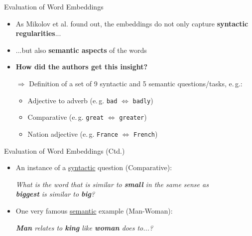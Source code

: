 \begin{frame}{Evaluation of Word Embeddings}{}
	\begin{itemize}
		\item As Mikolov et al. found out, the embeddings do not only capture \textbf{syntactic regularities}...
		\item ...but also \textbf{semantic aspects} of the words
		\item \textbf{How did the authors get this insight?}
		\item[$\bm{\Rightarrow}$] Definition of a set of 9 syntactic and 5 semantic questions/tasks, e.\,g.:
		\begin{itemize}
			\item Adjective to adverb (e.\,g. \texttt{bad} $\Leftrightarrow$ \texttt{badly})
			\item Comparative (e.\,g. \texttt{great} $\Leftrightarrow$ \texttt{greater})
			\item Nation adjective (e.\,g. \texttt{France} $\Leftrightarrow$ \texttt{French})
		\end{itemize}
	\end{itemize}
\end{frame}


\begin{frame}{Evaluation of Word Embeddings (Ctd.)}{}
	\begin{itemize}
		\item An instance of a \underline{syntactic} question (Comparative):
		\vspace*{2mm}
		\begin{center}
			\textit{What is the word that is similar to \textbf{small} in the same sense as \\
			\textbf{biggest} is similar to \textbf{big}?}
		\end{center}
		\vspace*{2mm}
		\item One very famous \underline{semantic} example (Man-Woman):
		\vspace*{2mm}
		\begin{center}
			\textit{\textbf{Man} relates to \textbf{king} like \textbf{woman} does to...?}
		\end{center}
	\end{itemize}
\end{frame}


